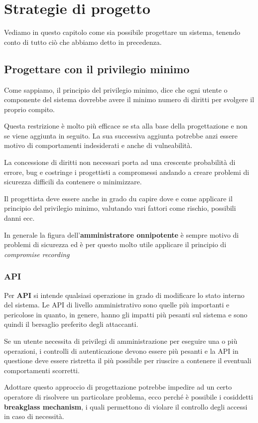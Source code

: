 \chapter{Strategie di progetto}
Vediamo in questo capitolo come sia possibile progettare un sistema, tenendo conto di tutto ciò che abbiamo detto in
precedenza.

\section{Progettare con il privilegio minimo}
Come sappiamo, il principio del privilegio minimo, dice che ogni utente o componente del sistema dovrebbe avere il
minimo numero di diritti per svolgere il proprio compito.

Questa restrizione è molto più efficace se sta alla base della progettazione e non se viene aggiunta in seguito. La
sua successiva aggiunta potrebbe anzi essere motivo di comportamenti indesiderati e anche di vulneabilità.

La concessione di diritti non necessari porta ad una crescente probabilità di errore, bug e costringe i progettisti a
compromessi andando a creare problemi di sicurezza difficili da contenere o minimizzare.

Il progettista deve essere anche in grado du  capire dove e come applicare il principio del privilegio minimo, valutando
vari fattori come rischio, possibili danni ecc.

In generale la figura dell'\textbf{amministratore onnipotente} è sempre motivo di problemi di sicurezza ed è per questo
molto utile applicare il principio di \emph{compromise recording}

\subsection{API}
Per \textbf{API} si intende qualsiasi operazione in grado di modificare lo stato interno del sistema. Le API di livello
amministrativo sono quelle più importanti e pericolose in quanto, in genere, hanno gli impatti più pesanti sul sistema
e sono quindi il bersaglio preferito degli attaccanti.

Se un utente necessita di privilegi di amministrazione per eseguire una o più operazioni, i controlli di autenticazione
devono essere più pesanti e la API in questione deve essere ristretta il più possibile per riuscire a contenere il
eventuali comportamenti scorretti.

Adottare questo approccio di progettazione potrebbe impedire ad un certo operatore di risolvere un particolare problema,
ecco perché è possibile i cosiddetti \textbf{breakglass mechanism}, i quali permettono di violare il controllo degli
accessi in caso di necessità.

